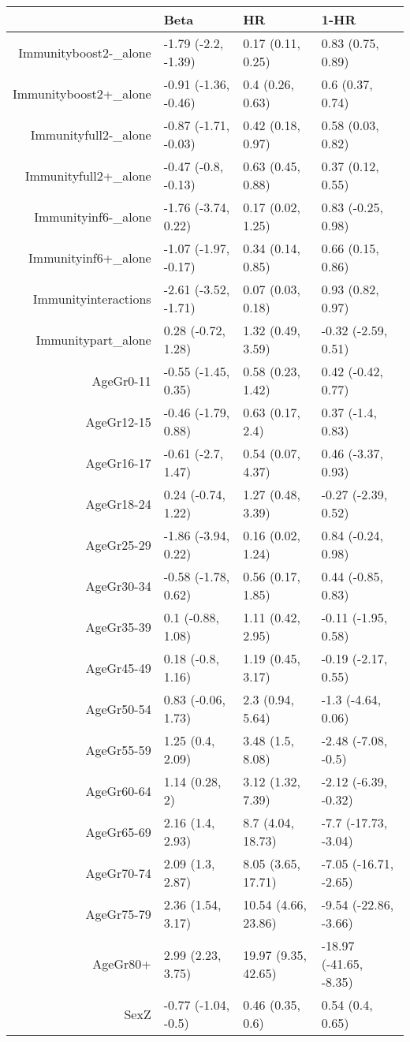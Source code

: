 \begin{table}[ht]
\centering
\begin{tabular}{rlll}
  \hline
 & Beta & HR & 1-HR \\ 
  \hline
Immunityboost2-\_alone & -1.79 (-2.2, -1.39) & 0.17 (0.11, 0.25) & 0.83 (0.75, 0.89) \\ 
  Immunityboost2+\_alone & -0.91 (-1.36, -0.46) & 0.4 (0.26, 0.63) & 0.6 (0.37, 0.74) \\ 
  Immunityfull2-\_alone & -0.87 (-1.71, -0.03) & 0.42 (0.18, 0.97) & 0.58 (0.03, 0.82) \\ 
  Immunityfull2+\_alone & -0.47 (-0.8, -0.13) & 0.63 (0.45, 0.88) & 0.37 (0.12, 0.55) \\ 
  Immunityinf6-\_alone & -1.76 (-3.74, 0.22) & 0.17 (0.02, 1.25) & 0.83 (-0.25, 0.98) \\ 
  Immunityinf6+\_alone & -1.07 (-1.97, -0.17) & 0.34 (0.14, 0.85) & 0.66 (0.15, 0.86) \\ 
  Immunityinteractions & -2.61 (-3.52, -1.71) & 0.07 (0.03, 0.18) & 0.93 (0.82, 0.97) \\ 
  Immunitypart\_alone & 0.28 (-0.72, 1.28) & 1.32 (0.49, 3.59) & -0.32 (-2.59, 0.51) \\ 
  AgeGr0-11 & -0.55 (-1.45, 0.35) & 0.58 (0.23, 1.42) & 0.42 (-0.42, 0.77) \\ 
  AgeGr12-15 & -0.46 (-1.79, 0.88) & 0.63 (0.17, 2.4) & 0.37 (-1.4, 0.83) \\ 
  AgeGr16-17 & -0.61 (-2.7, 1.47) & 0.54 (0.07, 4.37) & 0.46 (-3.37, 0.93) \\ 
  AgeGr18-24 & 0.24 (-0.74, 1.22) & 1.27 (0.48, 3.39) & -0.27 (-2.39, 0.52) \\ 
  AgeGr25-29 & -1.86 (-3.94, 0.22) & 0.16 (0.02, 1.24) & 0.84 (-0.24, 0.98) \\ 
  AgeGr30-34 & -0.58 (-1.78, 0.62) & 0.56 (0.17, 1.85) & 0.44 (-0.85, 0.83) \\ 
  AgeGr35-39 & 0.1 (-0.88, 1.08) & 1.11 (0.42, 2.95) & -0.11 (-1.95, 0.58) \\ 
  AgeGr45-49 & 0.18 (-0.8, 1.16) & 1.19 (0.45, 3.17) & -0.19 (-2.17, 0.55) \\ 
  AgeGr50-54 & 0.83 (-0.06, 1.73) & 2.3 (0.94, 5.64) & -1.3 (-4.64, 0.06) \\ 
  AgeGr55-59 & 1.25 (0.4, 2.09) & 3.48 (1.5, 8.08) & -2.48 (-7.08, -0.5) \\ 
  AgeGr60-64 & 1.14 (0.28, 2) & 3.12 (1.32, 7.39) & -2.12 (-6.39, -0.32) \\ 
  AgeGr65-69 & 2.16 (1.4, 2.93) & 8.7 (4.04, 18.73) & -7.7 (-17.73, -3.04) \\ 
  AgeGr70-74 & 2.09 (1.3, 2.87) & 8.05 (3.65, 17.71) & -7.05 (-16.71, -2.65) \\ 
  AgeGr75-79 & 2.36 (1.54, 3.17) & 10.54 (4.66, 23.86) & -9.54 (-22.86, -3.66) \\ 
  AgeGr80+ & 2.99 (2.23, 3.75) & 19.97 (9.35, 42.65) & -18.97 (-41.65, -8.35) \\ 
  SexZ & -0.77 (-1.04, -0.5) & 0.46 (0.35, 0.6) & 0.54 (0.4, 0.65) \\ 
   \hline
\end{tabular}
\end{table}
